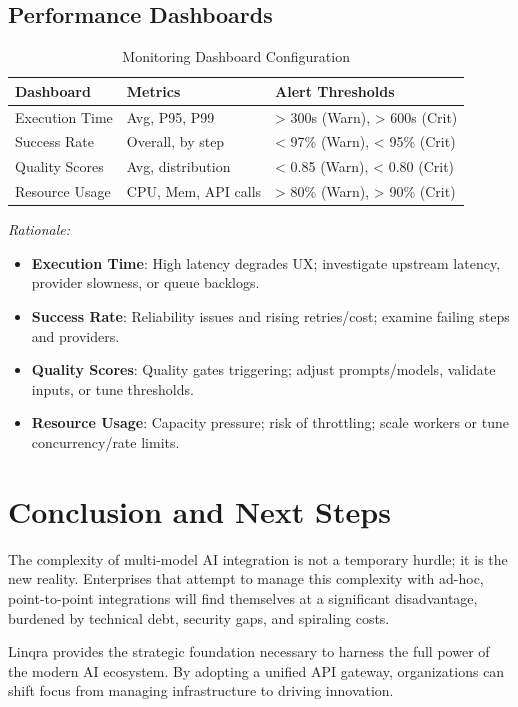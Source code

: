 \documentclass[11pt,a4paper]{article}
\begin{document}
\subsection{Performance Dashboards}

\begin{table}[H]
\centering
\renewcommand{\arraystretch}{1.25}
\setlength{\tabcolsep}{6pt}
\begin{tabularx}{\textwidth}{|l|l|X|}
\hline
\textbf{Dashboard} & \textbf{Metrics} & \textbf{Alert Thresholds} \\
\hline
Execution Time & Avg, P95, P99 & > 300s (Warn), > 600s (Crit) \\
Success Rate & Overall, by step & < 97\% (Warn), < 95\% (Crit) \\
Quality Scores & Avg, distribution & < 0.85 (Warn), < 0.80 (Crit) \\
Resource Usage & CPU, Mem, API calls & > 80\% (Warn), > 90\% (Crit) \\
\hline
\end{tabularx}
\caption{Monitoring Dashboard Configuration}
\end{table}

\small
\noindent\textit{Rationale:}
\begin{itemize}[leftmargin=*]
  \item \textbf{Execution Time}: High latency degrades UX; investigate upstream latency, provider slowness, or queue backlogs.
  \item \textbf{Success Rate}: Reliability issues and rising retries/cost; examine failing steps and providers.
  \item \textbf{Quality Scores}: Quality gates triggering; adjust prompts/models, validate inputs, or tune thresholds.
  \item \textbf{Resource Usage}: Capacity pressure; risk of throttling; scale workers or tune concurrency/rate limits.
\end{itemize}
\normalsize

\newpage
\section{Conclusion and Next Steps}
The complexity of multi-model AI integration is not a temporary hurdle; it is the new reality. Enterprises that attempt to manage this complexity with ad-hoc, point-to-point integrations will find themselves at a significant disadvantage, burdened by technical debt, security gaps, and spiraling costs.

Linqra provides the strategic foundation necessary to harness the full power of the modern AI ecosystem. By adopting a unified API gateway, organizations can shift focus from managing infrastructure to driving innovation.
\end{document}
